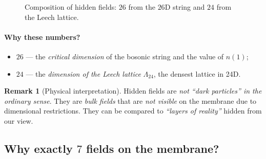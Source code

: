 \documentclass[11pt,a4paper]{article}
\newcommand{\Nhidden}{N_{\text{hidden}}}
\theoremstyle{definition}
\newtheorem{remark}[theorem]{Remark}
\begin{document}
\begin{figure}[htbp]
\centering
{}
\caption{Composition of hidden fields: $26$ from the $26$D string and $24$ from 
the Leech lattice.}
\label{fig:hidden-fields}
\end{figure}

\paragraph{Why these numbers?}
\begin{itemize}
    \item $26$ — the \emph{critical dimension} of the bosonic string 
          and the value of $n(1)$;
    \item $24$ — the \emph{dimension of the Leech lattice} $\Lambda_{24}$, 
          the densest lattice in 24D.
\end{itemize}

\begin{remark}[Physical interpretation]
\label{rem:hidden-physics}
Hidden fields are \emph{not ``dark particles'' in the ordinary sense}. 
They are \emph{bulk fields} that are \emph{not visible} on the membrane 
due to dimensional restrictions. They can be compared to 
\emph{``layers of reality''} hidden from our view.
\end{remark}

\subsection{Why exactly $7$ fields on the membrane?}
\label{subsec:why-seven}
\end{document}
